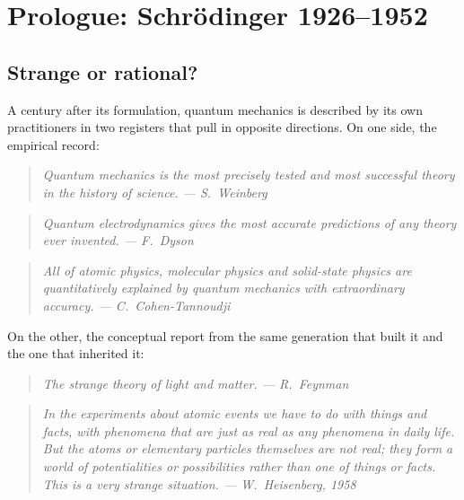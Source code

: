\chapter*{Prologue: Schr\"odinger 1926--1952}
\label{ch:prologue}

\section*{Strange or rational?}\label{sec:prologue-strange}

A century after its formulation, quantum mechanics is described by its own practitioners in two registers that pull in opposite directions. On one side, the empirical record:

\begin{quote}
\itshape Quantum mechanics is the most precisely tested and most successful theory in the history of science. \normalfont\hfill --- S.~Weinberg
\end{quote}

\begin{quote}
\itshape Quantum electrodynamics gives the most accurate predictions of any theory ever invented. \normalfont\hfill --- F.~Dyson
\end{quote}

\begin{quote}
\itshape All of atomic physics, molecular physics and solid-state physics are quantitatively explained by quantum mechanics with extraordinary accuracy. \normalfont\hfill --- C.~Cohen-Tannoudji
\end{quote}

On the other, the conceptual report from the same generation that built it and the one that inherited it:

\begin{quote}
\itshape The strange theory of light and matter. \normalfont\hfill --- R.~Feynman
\end{quote}

\begin{quote}
\itshape In the experiments about atomic events we have to do with things and facts, with phenomena that are just as real as any phenomena in daily life. But the atoms or elementary particles themselves are not real; they form a world of potentialities or possibilities rather than one of things or facts. This is a very strange situation. \normalfont\hfill --- W.~Heisenberg, 1958
\end{quote}

